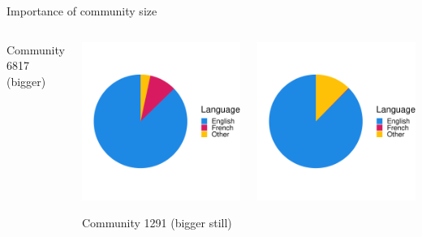 \documentclass{beamer}\usepackage[]{graphicx}\usepackage[]{color}
\makeatletter
\def\maxwidth{ %
  \ifdim\Gin@nat@width>\linewidth
    \linewidth
  \else
    \Gin@nat@width
  \fi
}
\makeatother
\begin{document}
\begin{frame}
\begin{columns}[t]
\begin{block}{Importance of community size}
\begin{columns}
\begin{center}
                Community 6817 (bigger)
              \end{center}
              \begin{center}

\includegraphics[width=\maxwidth]{figure/unnamed-chunk-3-1} 

                Community 1291 (bigger still)
              \end{center}
              \begin{center}

\includegraphics[width=\maxwidth]{figure/unnamed-chunk-4-1} 


\end{center}
\end{columns}
\end{block}
\end{columns}
\end{frame}
\end{document}
